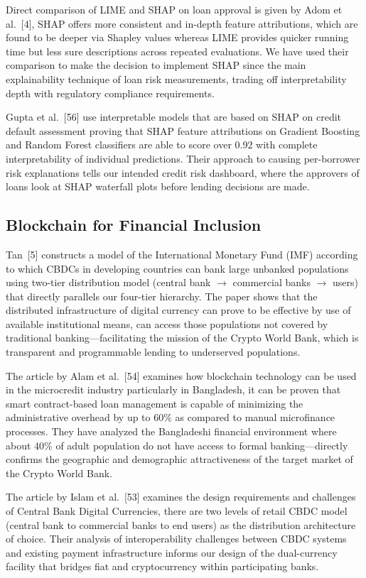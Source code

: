 \documentclass[12pt,a4paper]{report}
\begin{document}
Direct comparison of LIME and SHAP on loan approval is given by Adom et al.~[4], SHAP offers more consistent and in-depth feature attributions, which are found to be deeper via Shapley values whereas LIME provides quicker running time but less sure descriptions across repeated evaluations. We have used their comparison to make the decision to implement SHAP since the main explainability technique of loan risk measurements, trading off interpretability depth with regulatory compliance requirements.

Gupta et al.~[56] use interpretable models that are based on SHAP on credit default assessment proving that SHAP feature attributions on Gradient Boosting and Random Forest classifiers are able to score over 0.92 with complete interpretability of individual predictions. Their approach to causing per-borrower risk explanations tells our intended credit risk dashboard, where the approvers of loans look at SHAP waterfall plots before lending decisions are made.

\subsection{Blockchain for Financial Inclusion}

Tan~[5] constructs a model of the International Monetary Fund (IMF) according to which CBDCs in developing countries can bank large unbanked populations using two-tier distribution model (central bank $\to$ commercial banks $\to$ users) that directly parallels our four-tier hierarchy. The paper shows that the distributed infrastructure of digital currency can prove to be effective by use of available institutional means, can access those populations not covered by traditional banking---facilitating the mission of the Crypto World Bank, which is transparent and programmable lending to underserved populations.

The article by Alam et al.~[54] examines how blockchain technology can be used in the microcredit industry particularly in Bangladesh, it can be proven that smart contract-based loan management is capable of minimizing the administrative overhead by up to 60\% as compared to manual microfinance processes. They have analyzed the Bangladeshi financial environment where about 40\% of adult population do not have access to formal banking---directly confirms the geographic and demographic attractiveness of the target market of the Crypto World Bank.

The article by Islam et al.~[53] examines the design requirements and challenges of Central Bank Digital Currencies, there are two levels of retail CBDC model (central bank to commercial banks to end users) as the distribution architecture of choice. Their analysis of interoperability challenges between CBDC systems and existing payment infrastructure informs our design of the dual-currency facility that bridges fiat and cryptocurrency within participating banks.
\end{document}

